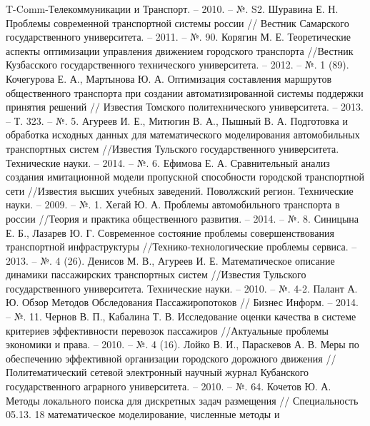 \begin{thebibliography}{10}
        T-Comm-Телекоммуникации и Транспорт. -- 2010. -- №. S2.
     Шуравина Е. Н. Проблемы современной транспортной системы россии //
        Вестник Самарского государственного университета. -- 2011. -- №. 90.
     Корягин М. Е. Теоретические аспекты оптимизации управления движением городского 
        транспорта //Вестник Кузбасского государственного технического университета. -- 2012. -- №. 1 (89).
     Кочегурова Е. А., Мартынова Ю. А. Оптимизация составления маршрутов общественного 
        транспорта при создании автоматизированной системы поддержки принятия решений //
        Известия Томского политехнического университета. -- 2013. -- Т. 323. -- №. 5.
     Агуреев И. Е., Митюгин В. А., Пышный В. А. Подготовка и обработка исходных данных 
        для математического моделирования автомобильных транспортных систем //Известия Тульского 
        государственного университета. Технические науки. -- 2014. -- №. 6.
     Ефимова Е. А. Сравнительный анализ создания имитационной модели пропускной 
        способности городской транспортной сети //Известия высших учебных заведений. Поволжский регион. 
        Технические науки. -- 2009. -- №. 1.
     Хегай Ю. А. Проблемы автомобильного транспорта в россии //Теория и практика 
        общественного развития. -- 2014. -- №. 8.
     Синицына Е. Б., Лазарев Ю. Г. Современное состояние проблемы совершенствования 
        транспортной инфраструктуры //Технико-технологические проблемы сервиса. -- 2013. -- №. 4 (26).
     Денисов М. В., Агуреев И. Е. Математическое описание динамики пассажирских 
        транспортных систем //Известия Тульского государственного университета. 
        Технические науки. -- 2010. -- №. 4-2.
     Палант А. Ю. Обзор Методов Обследования Пассажиропотоков //
        Бизнес Информ. -- 2014. -- №. 11.
     Чернов В. П., Кабалина Т. В. Исследование оценки качества в системе критериев 
        эффективности перевозок пассажиров //Актуальные проблемы экономики и права. -- 2010. -- №. 4 (16).
     Лойко В. И., Параскевов А. В. Меры по обеспечению эффективной организации городского 
        дорожного движения //Политематический сетевой электронный научный журнал Кубанского 
        государственного аграрного университета. -- 2010. -- №. 64.
     Кочетов Ю. А. Методы локального поиска для дискретных задач размещения //
        Специальность 05.13. 18 математическое моделирование, численные методы и 

\end{thebibliography}
